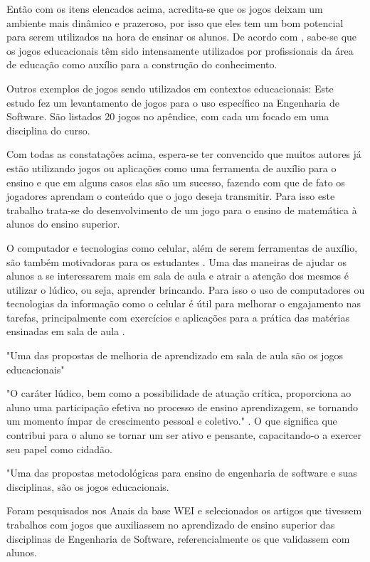 Então com os itens elencados acima, acredita-se que os jogos deixam um ambiente mais dinâmico e prazeroso, por isso que eles tem um bom potencial para serem utilizados na hora de ensinar os alunos. De acordo com \cite{nunesParreira}, sabe-se que os jogos educacionais têm sido intensamente utilizados por profissionais da área de educação como auxílio para a construção do conhecimento.

Outros exemplos de jogos sendo utilizados em contextos educacionais: Este estudo \cite{sucessoJogoEngSoft} fez um levantamento de jogos para o uso específico na Engenharia de Software. São listados 20 jogos no apêndice, com cada um focado em uma disciplina do curso. 

Com todas as constatações acima, espera-se ter convencido que muitos autores já estão utilizando jogos ou aplicações como uma ferramenta de auxílio para o ensino e que em alguns casos elas são um sucesso, fazendo com que de fato os jogadores aprendam o conteúdo que o jogo deseja transmitir. Para isso este trabalho trata-se do desenvolvimento de um jogo para o ensino de matemática à alunos do ensino superior.

O computador e tecnologias como celular, além de serem ferramentas de auxílio, são também  motivadoras para os estudantes \cite{softwaregamificado}.
Uma das maneiras de ajudar os alunos a se interessarem mais em sala de aula e atrair a atenção dos mesmos é utilizar o lúdico, ou seja, aprender brincando. Para isso o uso de computadores ou tecnologias da informação como o celular é útil para melhorar o engajamento nas tarefas, principalmente com exercícios e aplicações para a prática das matérias ensinadas em sala de aula \cite{tdahNasEscolas2}.

"Uma das propostas de melhoria de aprendizado em sala de aula são os jogos educacionais" \cite[p. 4]{sucessoJogoEngSoft}


"O caráter lúdico, bem como a possibilidade de atuação crítica, proporciona ao aluno uma participação efetiva no processo de ensino aprendizagem, se tornando um momento ímpar de crescimento pessoal e coletivo." \cite{jogoPratPedagoc}. O que significa que contribui para o aluno se tornar um ser ativo e pensante, capacitando-o a exercer seu papel como cidadão.


"Uma das propostas metodológicas para ensino de engenharia de software e suas disciplinas, são os jogos educacionais. 


\begin{citacao}
Foram pesquisados nos Anais da base WEI e selecionados os artigos que tivessem trabalhos com jogos que auxiliassem no aprendizado de ensino superior das disciplinas de Engenharia de Software, referencialmente os que validassem com alunos. \cite{sucessoJogoEngSoft}
\end{citacao}



